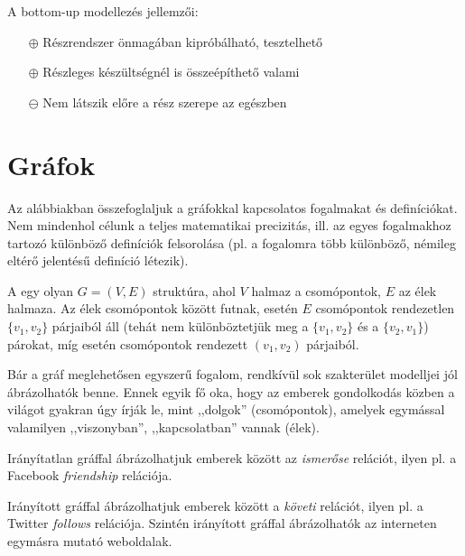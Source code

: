 A bottom-up modellezés jellemzői:

\begin{itemize}
\item[$\oplus$] Részrendszer önmagában kipróbálható, tesztelhető
\item[$\oplus$] Részleges készültségnél is összeépíthető valami
\item[$\ominus$] Nem látszik előre a rész szerepe az egészben
\end{itemize}

\section{Gráfok}
\label{sec:graf}

Az alábbiakban összefoglaljuk a gráfokkal kapcsolatos fogalmakat és definíciókat. Nem mindenhol célunk a teljes matematikai precizitás, ill. az egyes fogalmakhoz tartozó különböző definíciók felsorolása (pl. a  fogalomra több különböző, némileg eltérő jelentésű definíció létezik).


\begin{definicio}
A  egy olyan $G = (V, E)$ struktúra, ahol $V$ halmaz a csomópontok, $E$ az élek halmaza. Az élek csomópontok között futnak,  esetén $E$ csomópontok rendezetlen $\{v_1, v_2\}$ párjaiból áll (tehát nem különböztetjük meg a $\{v_1, v_2\}$ és a $\{v_2, v_1\}$) párokat, míg  esetén csomópontok rendezett $(v_1, v_2)$ párjaiból.
\end{definicio}

Bár a gráf meglehetősen egyszerű fogalom, rendkívül sok szakterület modelljei jól ábrázolhatók benne. Ennek egyik fő oka, hogy az emberek gondolkodás közben a világot gyakran úgy írják le, mint ,,dolgok'' (csomópontok), amelyek egymással valamilyen ,,viszonyban'', ,,kapcsolatban'' vannak (élek).

\begin{pelda}
Irányítatlan gráffal ábrázolhatjuk emberek között az \emph{ismerőse} relációt, ilyen pl. a Facebook \emph{friendship} relációja.
\end{pelda}

\begin{pelda}
Irányított gráffal ábrázolhatjuk emberek között a \emph{követi} relációt, ilyen pl. a Twitter \emph{follows} relációja. Szintén irányított gráffal ábrázolhatók az interneten egymásra mutató weboldalak.
\end{pelda}


